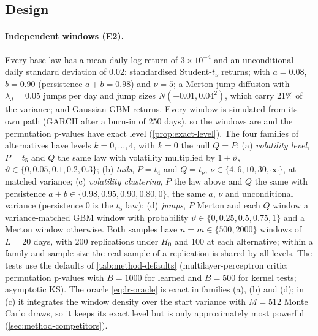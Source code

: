 \subsection{Design}\label{sec:sim-design}

\paragraph{Independent windows (E2).}
Every base law has a mean daily log-return of $3\times10^{-4}$ and an unconditional daily standard
deviation of 0.02: \iid{} standardised Student-$t_\nu$ returns; \GARCHt{}
\citep{bollerslev1986generalized,bollerslev1987conditionally} with $a=0.08$, $b=0.90$ (persistence
$a+b=0.98$) and $\nu=5$; a Merton jump-diffusion \citep{merton1976option} with $\lambda_J=0.05$ jumps
per day and jump sizes $N(-0.01,0.04^2)$, which carry 21\% of the variance; and Gaussian GBM
returns. Every window is simulated from its own path (GARCH after a burn-in of 250 days), so the
windows are \iid{} and the permutation p-values have exact level (\cref{prop:exact-level}). The four
families of alternatives have levels $k=0,\dots,4$, with $k=0$ the null $Q=P$:
(a) \emph{volatility level}, $P=t_5$ and $Q$ the same law with volatility multiplied by
$1+\vartheta$, $\vartheta\in\{0,0.05,0.1,0.2,0.3\}$;
(b) \emph{tails}, $P=t_4$ and $Q=t_\nu$, $\nu\in\{4,6,10,30,\infty\}$, at matched variance;
(c) \emph{volatility clustering}, $P$ the \GARCHt{} law above and $Q$ the same with persistence
$a+b\in\{0.98,0.95,0.90,0.80,0\}$, the same $a$, $\nu$ and unconditional variance (persistence 0 is
the \iid{} $t_5$ law);
(d) \emph{jumps}, $P$ Merton and each $Q$ window a variance-matched GBM window with probability
$\vartheta\in\{0,0.25,0.5,0.75,1\}$ and a Merton window otherwise.
Both samples have $n=m\in\{500,2000\}$ windows of $L=20$ days, with 200 replications under $H_0$ and
100 at each alternative; within a family and sample size the real sample of a replication is shared
by all levels. The tests use the defaults of \cref{tab:method-defaults} (multilayer-perceptron critic;
permutation p-values with $B=1000$ for learned and $B=500$ for kernel tests; asymptotic KS). The
oracle \eqref{eq:lr-oracle} is exact in families (a), (b) and (d); in (c) it integrates the window
density over the start variance with $M=512$ Monte Carlo draws, so it keeps its exact level but is
only approximately most powerful (\cref{sec:method-competitors}).

